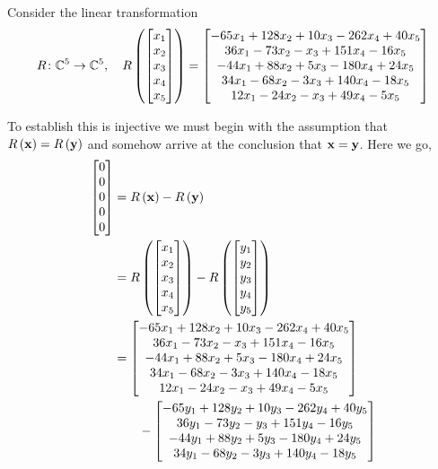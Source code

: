 \documentclass{ximera}
\begin{document}
\begin{example}[Injective]

Consider the linear transformation
\[
R\colon \mathbb{C}^{5}\rightarrow\mathbb{C}^{5},\quad
R\left(\begin{bmatrix}x_1\\x_2\\x_3\\x_4\\x_5\end{bmatrix}\right)=
\begin{bmatrix}-65 x_1 + 128 x_2 + 10 x_3 - 262 x_4 + 40 x_5\\
36 x_1 - 73 x_2 - x_3 + 151 x_4 - 16 x_5\\
-44 x_1 + 88 x_2 + 5 x_3 - 180 x_4 + 24 x_5\\
34 x_1 - 68 x_2 - 3 x_3 + 140 x_4 - 18 x_5\\
12 x_1 - 24 x_2 - x_3 + 49 x_4 - 5 x_5\end{bmatrix}
\]

To establish this is injective we must begin with the assumption that $R\left(\mathbf{x}\right)=R\left(\mathbf{y}\right)$ and somehow arrive at the conclusion that $\mathbf{x}=\mathbf{y}$.  Here we go,
\begin{align*}
\begin{bmatrix}0\\0\\0\\0\\0\end{bmatrix}
&=R\left(\mathbf{x}\right)-R\left(\mathbf{y}\right)\\
&=R\left(\begin{bmatrix}x_1\\x_2\\x_3\\x_4\\x_5\end{bmatrix}\right)-R\left(\begin{bmatrix}y_1\\y_2\\y_3\\y_4\\y_5\end{bmatrix}\right)\\
&=
\begin{bmatrix}-65 x_1 + 128 x_2 + 10 x_3 - 262 x_4 + 40 x_5\\
36 x_1 - 73 x_2 - x_3 + 151 x_4 - 16 x_5\\
-44 x_1 + 88 x_2 + 5 x_3 - 180 x_4 + 24 x_5\\
34 x_1 - 68 x_2 - 3 x_3 + 140 x_4 - 18 x_5\\
12 x_1 - 24 x_2 - x_3 + 49 x_4 - 5 x_5\end{bmatrix}\\
&\quad\quad-
\begin{bmatrix}-65 y_1 + 128 y_2 + 10 y_3 - 262 y_4 + 40 y_5\\
36 y_1 - 73 y_2 - y_3 + 151 y_4 - 16 y_5\\
-44 y_1 + 88 y_2 + 5 y_3 - 180 y_4 + 24 y_5\\
34 y_1 - 68 y_2 - 3 y_3 + 140 y_4 - 18 y_5\\
\end{bmatrix}
\end{align*}
\end{example}
\end{document}
